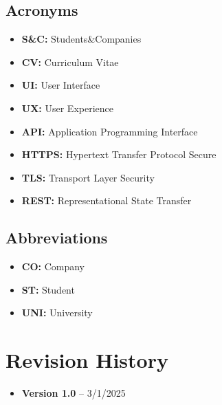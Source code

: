 \subsection{Acronyms}\label{subsec:acronyms}
\begin{itemize}
    \item \textbf{S\&C:} Students\&Companies
    \item \textbf{CV:} Curriculum Vitae
    \item \textbf{UI:} User Interface
    \item \textbf{UX:} User Experience
    \item \textbf{API:} Application Programming Interface
    \item \textbf{HTTPS:} Hypertext Transfer Protocol Secure
    \item \textbf{TLS:} Transport Layer Security
    \item \textbf{REST:} Representational State Transfer

\end{itemize}

\subsection{Abbreviations}\label{subsec:abbreviations}
\begin{itemize}
    \item \textbf{CO:} Company
    \item \textbf{ST:} Student
    \item \textbf{UNI:} University
\end{itemize}

\section{Revision History}\label{sec:revision history}
\begin{itemize}
    \item \textbf{Version 1.0} – 3/1/2025
\end{itemize}
